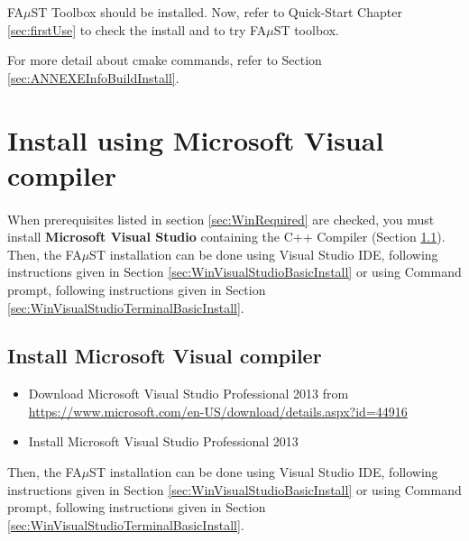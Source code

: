 FA$\mu$ST Toolbox should be installed. Now, refer to Quick-Start Chapter \ref{sec:firstUse} to check the install and to try FA$\mu$ST toolbox.

For more detail about cmake commands, refer to Section \ref{sec:ANNEXEInfoBuildInstall}.


\section{Install using Microsoft Visual compiler}\label{sec:WinInstallVS}

\paragraph{}When prerequisites listed in section \ref{sec:WinRequired} are checked, you must install \textbf{Microsoft Visual Studio} containing the C++ Compiler (Section \ref{sec:WinInstallCompilerVS}).
Then, the FA$\mu$ST installation can be done using Visual Studio IDE, following instructions given in Section \ref{sec:WinVisualStudioBasicInstall} or using Command prompt, following instructions given in Section \ref{sec:WinVisualStudioTerminalBasicInstall}. 



\subsection{Install Microsoft Visual compiler}\label{sec:WinInstallCompilerVS} 

\begin{itemize}
\item Download Microsoft Visual Studio Professional 2013 from \url{https://www.microsoft.com/en-US/download/details.aspx?id=44916}
\item Install Microsoft Visual Studio Professional 2013
\end{itemize}
Then, the FA$\mu$ST installation can be done using Visual Studio IDE, following instructions given in Section \ref{sec:WinVisualStudioBasicInstall} or using Command prompt, following instructions given in Section \ref{sec:WinVisualStudioTerminalBasicInstall}. 

